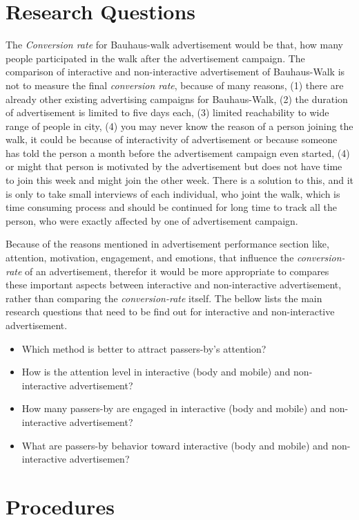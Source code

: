 \section{Research Questions}
The \emph{Conversion rate} for Bauhaus-walk advertisement would be that, how many people participated in the walk after the advertisement campaign. The comparison of interactive and non-interactive advertisement of Bauhaus-Walk is not to measure the final \emph{conversion rate}, because of many reasons, (1) there are already other existing advertising campaigns for Bauhaus-Walk, (2) the duration of advertisement is limited to five days each, (3) limited reachability to wide range of people in city, (4) you may never know the reason of a person joining the walk, it could be because of interactivity of advertisement or because someone has told the person a month before the advertisement campaign even started, (4) or might that person is motivated by the advertisement but does not have time to join this week and might join the other week. There is a solution to this, and it is only to take small interviews of each individual, who joint the walk, which is time consuming process and should be continued for long time to track all the person, who were exactly affected by one of advertisement campaign.

Because of the reasons mentioned in advertisement performance section like, attention, motivation, engagement, and emotions, that influence the \emph{conversion-rate} of an advertisement, therefor it would be more appropriate to compares these important aspects between interactive and non-interactive advertisement, rather than comparing the \emph{conversion-rate} itself. The bellow lists the main research questions that need to be find out for interactive and non-interactive advertisement.

\begin{itemize}
\item Which method is better to attract passers-by's attention? 
\item How is the attention level in interactive (body and mobile) and non-interactive advertisement?
\item How many passers-by are engaged in interactive (body and mobile) and non-interactive advertisement?
\item What are passers-by behavior toward interactive (body and mobile) and non-interactive advertisemen?
\end{itemize}

\section{Procedures}

